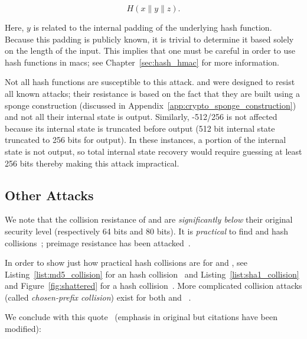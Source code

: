 \begin{equation}
    H(x\|y\|z).
\end{equation}

\noindent
Here, $y$ is related to the internal padding of the underlying
\gls{hash function}.
Because this padding is publicly known,
it is trivial to determine it based solely on the length of the input.
This implies that one must be careful in order to use
\glspl{hash function} in \glspl{mac};
see Chapter~\ref{sec:hash_hmac} for more information.

Not all \glspl{hash function} are susceptible to this attack.
\Keccak{} and \ShaThree{} were designed to resist all known attacks;
their resistance is based on the fact that they are built
using a sponge construction
(discussed in Appendix~\ref{app:crypto_sponge_construction})
and not all their internal state is output.
Similarly, \ShaTwo{}-512/256 is not affected because its internal state
is truncated before output
(512 bit internal state truncated to 256 bits for output).
In these instances, a portion of the internal state is not output,
so total internal state recovery would require guessing at least 256 bits
thereby making this attack impractical.

\subsection{Other Attacks}

We note that the collision resistance of \MDFive{} and \ShaOne{}
are \emph{significantly below} their original security level
(respectively 64 bits and 80 bits).
It is \emph{practical} to find \MDFive{} and \ShaOne{} hash
collisions~\cite{cryptoeprint:2004:199,cryptoeprint:2005:067,
cryptoeprint:2004:356,rfc6151,rfc6194};
\MDFive{} preimage resistance has been attacked~\cite{MD5FastPreimage2009}.

In order to show just how practical hash collisions are
for \MDFive{} and \ShaOne{},
see Listing~\ref{list:md5_collision}
for an \MDFive{} hash collision~\cite{md5Collision}
and Listing~\ref{list:sha1_collision} and Figure~\ref{fig:shattered}
for a \ShaOne{} hash collision~\cite{sha1Collision}.
More complicated collision attacks
(called \emph{chosen-prefix collision})
exist for both \MDFive{} and
\ShaOne{}~\cite{stevens2012chosen,leurent2020sha1,cryptoeprint:2020/014}.

We conclude with this quote~\cite[Section 7]{cryptoeprint:2020/014}
(emphasis in original but citations have been modified):


